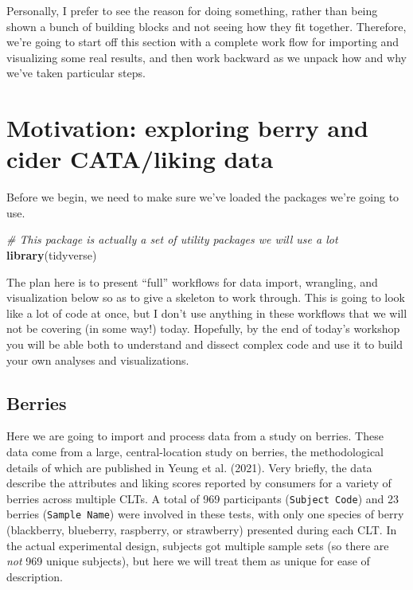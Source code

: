 \documentclass[
]{book}
\newenvironment{Shaded}{\begin{snugshade}}{\end{snugshade}}
\newcommand{\CommentTok}[1]{\textcolor[rgb]{0.56,0.35,0.01}{\textit{#1}}}
\newcommand{\FunctionTok}[1]{\textcolor[rgb]{0.13,0.29,0.53}{\textbf{#1}}}
\newcommand{\NormalTok}[1]{#1}
\begin{document}
Personally, I prefer to see the reason for doing something, rather than being shown a bunch of building blocks and not seeing how they fit together. Therefore, we're going to start off this section with a complete work flow for importing and visualizing some real results, and then work backward as we unpack how and why we've taken particular steps.

\hypertarget{motivation-exploring-berry-and-cider-cataliking-data}{%
\section{Motivation: exploring berry and cider CATA/liking data}\label{motivation-exploring-berry-and-cider-cataliking-data}}

Before we begin, we need to make sure we've loaded the packages we're going to use.

\begin{Shaded}
\begin{Highlighting}[]
\CommentTok{\# This package is actually a set of utility packages we will use a lot}
\FunctionTok{library}\NormalTok{(tidyverse)}
\end{Highlighting}
\end{Shaded}

The plan here is to present ``full'' workflows for data import, wrangling, and visualization below so as to give a skeleton to work through. This is going to look like a lot of code at once, but I don't use anything in these workflows that we will not be covering (in some way!) today. Hopefully, by the end of today's workshop you will be able both to understand and dissect complex code and use it to build your own analyses and visualizations.

\hypertarget{berries}{%
\subsection{Berries}\label{berries}}

Here we are going to import and process data from a study on berries. These data come from a large, central-location study on berries, the methodological details of which are published in Yeung et al. (2021). Very briefly, the data describe the attributes and liking scores reported by consumers for a variety of berries across multiple CLTs. A total of 969 participants (\texttt{Subject\ Code}) and 23 berries (\texttt{Sample\ Name}) were involved in these tests, with only one species of berry (blackberry, blueberry, raspberry, or strawberry) presented during each CLT. In the actual experimental design, subjects got multiple sample sets (so there are \emph{not} 969 unique subjects), but here we will treat them as unique for ease of description.
\end{document}
